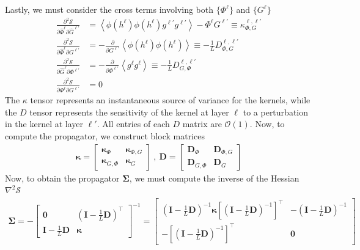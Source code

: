 \documentclass{article} %
\begin{document}
Lastly, we must consider the cross terms involving both $\{ \Phi^\ell \}$ and $\{ G^\ell \}$
\begin{align}
    \frac{\partial^2 \mathcal S}{\partial \hat \Phi^\ell \partial \hat G^{\ell'}} &= \left<  \phi(h^\ell) \phi(h^{\ell}) g^{\ell'} g^{\ell'} \right> - \Phi^\ell G^{\ell'} \equiv \kappa^{\ell,\ell'}_{\Phi, G} \nonumber
   \\
   \frac{\partial^2 \mathcal S}{\partial \hat \Phi^\ell \partial G^{\ell'}} &=  - \frac{\partial}{\partial G^{\ell'}} \left< \phi(h^\ell) \phi(h^\ell) \right> \equiv  - \frac{1}{L} D^{\ell,\ell'}_{\Phi,G}  \nonumber
   \\
   \frac{\partial^2 \mathcal S}{\partial \hat G^\ell \partial \Phi^{\ell'}} &=  - \frac{\partial}{\partial \Phi^{\ell'}} \left< g^\ell g^\ell \right> \equiv  - \frac{1}{L} D^{\ell,\ell'}_{G,\Phi} \nonumber  
   \\
   \frac{\partial^2 \mathcal S}{\partial \Phi^\ell \partial G^{\ell'}} &= 0 
\end{align}
The $\kappa$ tensor represents an instantaneous source of variance for the kernels, while the $D$ tensor represents the sensitivity of the kernel at layer $\ell$ to a perturbation in the kernel at layer $\ell'$. All entries of each $D$ matrix are $\mathcal{O}(1)$. Now, to compute the propagator, we construct block matrices
\begin{align}
    \bm\kappa=  \begin{bmatrix}
        \bm\kappa_{\Phi} & \bm\kappa_{\Phi,G}
        \\
        \bm\kappa_{G,\Phi} &\bm\kappa_{G} 
    \end{bmatrix} \ , \ \bm D = \begin{bmatrix}
        \bm D_{\Phi} & \bm D_{\Phi, G}
        \\
        \bm D_{G,\Phi} & \bm D_{G}
    \end{bmatrix} 
\end{align}
Now, to obtain the propagator $\bm\Sigma$, we must compute the inverse of the Hessian $\nabla^2 \mathcal S$
\begin{align}
    \bm\Sigma = - 
    \begin{bmatrix}
        \bm 0 & (\bm I - \frac{1}{L} \bm D)^\top
        \\
        \bm I - \frac{1}{L} \bm D & \bm\kappa
    \end{bmatrix}^{-1} =
    \begin{bmatrix}
        \left( \bm I -  \frac{1}{L}  \bm D \right)^{-1} \bm\kappa \left[\left( \bm I - \frac{1}{L} \bm D \right)^{-1} \right]^\top & -\left( \bm I - \frac{1}{L} \bm D \right)^{-1}
        \\
        -\left[\left( \bm I - \frac{1}{L} \bm D \right)^{-1} \right]^\top & \bm 0        
    \end{bmatrix}
\end{align}
\end{document}
